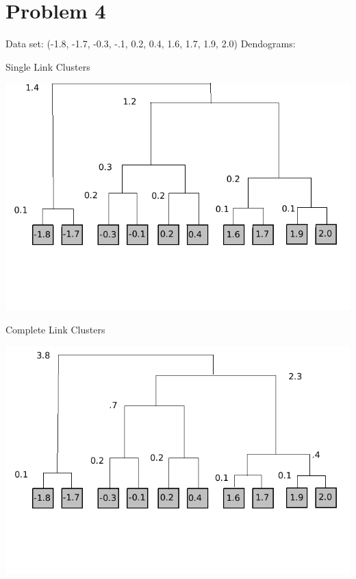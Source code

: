 \documentclass{article}
\begin{document}
\section{Problem 4}
Data set: (-1.8, -1.7, -0.3, -.1, 0.2, 0.4, 1.6, 1.7, 1.9, 2.0)
\newline\noindent Dendograms:
\begin{center}
Single Link Clusters
\end{center}
\includegraphics[scale = .5]{SingleLinkBox.png}
\begin{center}
Complete Link Clusters
\end{center}
\includegraphics[scale = .5]{CompleteLinkBox.png}
\end{document}
